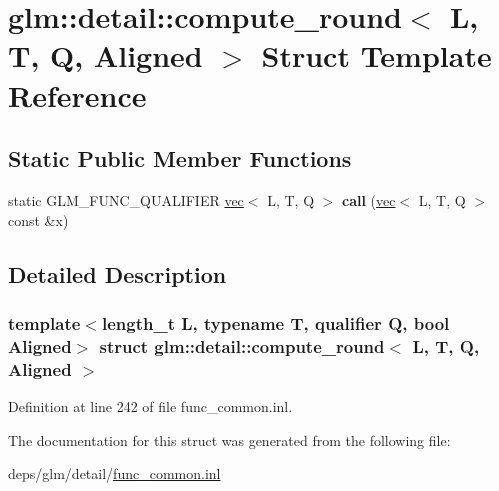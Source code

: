 \hypertarget{structglm_1_1detail_1_1compute__round}{}\section{glm\+:\+:detail\+:\+:compute\+\_\+round$<$ L, T, Q, Aligned $>$ Struct Template Reference}
\label{structglm_1_1detail_1_1compute__round}
\subsection*{Static Public Member Functions}
\begin{DoxyCompactItemize}
\item 
\mbox{\label{structglm_1_1detail_1_1compute__round_a25a3c9a2b89285f11c983227f3e73956}} 
static G\+L\+M\+\_\+\+F\+U\+N\+C\+\_\+\+Q\+U\+A\+L\+I\+F\+I\+ER \hyperlink{structglm_1_1vec}{vec}$<$ L, T, Q $>$ {\bfseries call} (\hyperlink{structglm_1_1vec}{vec}$<$ L, T, Q $>$ const \&x)
\end{DoxyCompactItemize}


\subsection{Detailed Description}
\subsubsection*{template$<$length\+\_\+t L, typename T, qualifier Q, bool Aligned$>$\newline
struct glm\+::detail\+::compute\+\_\+round$<$ L, T, Q, Aligned $>$}



Definition at line 242 of file func\+\_\+common.\+inl.



The documentation for this struct was generated from the following file\+:\begin{DoxyCompactItemize}
\item 
deps/glm/detail/\hyperlink{func__common_8inl}{func\+\_\+common.\+inl}\end{DoxyCompactItemize}
